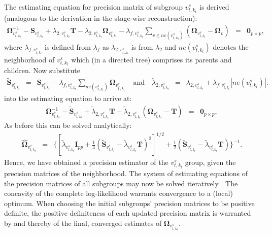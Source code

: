 \documentclass[10pt]{article}
\begin{document}
The estimating equation for precision matrix of subgroup $v_{t, k_t}^s$ is derived (analogous to the derivation in the stage-wise reconstruction):
\begin{eqnarray*}
\mathbf{\Omega}_{v_{t, k_t}^s}^{-1} - \mathbf{S}_{v_{t, k_t}^s} + \lambda_{2, v_{t, k_t}^s} \mathbf{T} - \lambda_{2, v_{t, k_t}^s} \mathbf{\Omega}_{v_{t, k_t}^s} - \lambda_{f, v_{t, k_t}^s} \sum_{v \in ne(v_{t, k_t}^s) } (\mathbf{\Omega}_{v_{t, k_t}^s} -\mathbf{\Omega}_{v}) & = & \mathbf{0}_{p \times p},
\end{eqnarray*}
where $\lambda_{f, v_{t, k_t}^s}$ is defined from $\lambda_f$ as $\lambda_{2, v_{t, k_t}^s}$ is from $\lambda_2$ and $ne(v_{t, k_t}^s)$ denotes the neighborhood of $v_{t, k_t}^s$ which (in a directed tree) comprises its parents and children. Now substitute
\begin{eqnarray*}
\tilde{\mathbf{S}}_{v_{t,k_t}^s} \, \, \, = \, \, \, \mathbf{S}_{v_{t,k_t}^s} - \lambda_{f, v_{t, k_t}^s} \sum_{ne(v_{t, k_t}^s)} \mathbf{\Omega}_{v_{t^{\prime},k_{t^{\prime}}}^s} \quad \mbox{and} \quad \tilde{\lambda}_{2, v_{t,k_{t}}^s} \, \, \, = \, \, \, \lambda_{2, v_{t,k_{t}}^s}  + \lambda_{f, v_{t,k_{t}}^s} | ne(v_{t,k_{t}}^s) |.
\end{eqnarray*}
into the estimating equation to arrive at:
\begin{eqnarray*}
\mathbf{\Omega}_{v_{t, k_t}^s}^{-1} - \tilde{\mathbf{S}}_{v_{t, k_t}^s} + \tilde{\lambda}_{2, v_{t, k_t}^s} \mathbf{T} - \tilde{\lambda}_{2, v_{t, k_t}^s}(\mathbf{\Omega}_{v_{t, k_t}^s} -\mathbf{T}) & = & \mathbf{0}_{p \times p},
\end{eqnarray*}
As before this can be solved analytically:
\begin{eqnarray}
\widehat{\mathbf{\Omega}}_{v_{t,k_{t}}^s} & = & \big\{[\tilde{\lambda}_{v_{t,k_{t}}^s} \mathbf{I}_{pp} + \tfrac{1}{4}(\tilde{\mathbf{S}}_{v_{t,k_{t}}^s}-\tilde{\lambda}_{v_{t,k_{t}}^s} \mathbf{T})^2]^{1/2} + \tfrac{1}{2} (\tilde{\mathbf{S}}_{v_{t,k_{t}}^s} - \tilde{\lambda}_{v_{t,k_{t}}^s}\mathbf{T}) \big\}^{-1}. \label{eq:thetahat}
\end{eqnarray}
Hence, we have obtained a precision estimator of the $v_{t,k_{t}}^s$ group, given the precision matrices of the neighborhood. The system of estimating equations of the precision matrices of all subgroups may now be solved iteratively \citep{Bilg2015}. The concavity of the complete log-likelihood warrants convergence to a (local) optimum. When choosing the initial subgroups' precision matrices to be positive definite, the positive definiteness of each updated precision matrix is warranted by \citet{van2016ridge} and thereby of the final, converged estimates of $\mathbf{\Omega}_{v_{t,k_{t}}^s}$.
\end{document}
